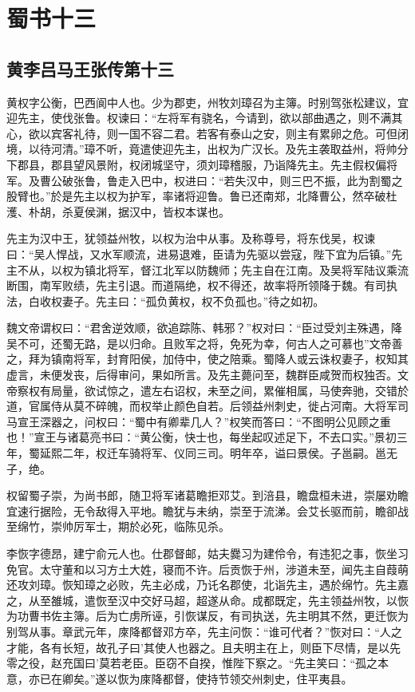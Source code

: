 \documentclass[12pt,UTF8]{ctexbook}
\begin{document}
\part{蜀书十三}
\chapter{黄李吕马王张传第十三}

黄权字公衡，巴西阆中人也。少为郡吏，州牧刘璋召为主簿。时别驾张松建议，宜迎先主，使伐张鲁。权谏曰：“左将军有骁名，今请到，欲以部曲遇之，则不满其心，欲以宾客礼待，则一国不容二君。若客有泰山之安，则主有累卵之危。可但闭境，以待河清。”璋不听，竟遣使迎先主，出权为广汉长。及先主袭取益州，将帅分下郡县，郡县望风景附，权闭城坚守，须刘璋稽服，乃诣降先主。先主假权偏将军。及曹公破张鲁，鲁走入巴中，权进曰：“若失汉中，则三巴不振，此为割蜀之股臂也。”於是先主以权为护军，率诸将迎鲁。鲁已还南郑，北降曹公，然卒破杜濩、朴胡，杀夏侯渊，据汉中，皆权本谋也。

先主为汉中王，犹领益州牧，以权为治中从事。及称尊号，将东伐吴，权谏曰：“吴人悍战，又水军顺流，进易退难，臣请为先驱以尝寇，陛下宜为后镇。”先主不从，以权为镇北将军，督江北军以防魏师；先主自在江南。及吴将军陆议乘流断围，南军败绩，先主引退。而道隔绝，权不得还，故率将所领降于魏。有司执法，白收权妻子。先主曰：“孤负黄权，权不负孤也。”待之如初。

魏文帝谓权曰：“君舍逆效顺，欲追踪陈、韩邪？”权对曰：“臣过受刘主殊遇，降吴不可，还蜀无路，是以归命。且败军之将，免死为幸，何古人之可慕也”文帝善之，拜为镇南将军，封育阳侯，加侍中，使之陪乘。蜀降人或云诛权妻子，权知其虚言，未便发丧，后得审问，果如所言。及先主薨问至，魏群臣咸贺而权独否。文帝察权有局量，欲试惊之，遣左右诏权，未至之间，累催相属，马使奔驰，交错於道，官属侍从莫不碎魄，而权举止颜色自若。后领益州刺史，徙占河南。大将军司马宣王深器之，问权曰：“蜀中有卿辈几人？”权笑而答曰：“不图明公见顾之重也！”宣王与诸葛亮书曰：“黄公衡，快士也，每坐起叹述足下，不去口实。”景初三年，蜀延熙二年，权迁车骑将军、仪同三司。明年卒，谥曰景侯。子邕嗣。邕无子，绝。

权留蜀子崇，为尚书郎，随卫将军诸葛瞻拒邓艾。到涪县，瞻盘桓未进，崇屡劝瞻宜速行据险，无令敌得入平地。瞻犹与未纳，崇至于流涕。会艾长驱而前，瞻卻战至绵竹，崇帅厉军士，期於必死，临陈见杀。

李恢字德昂，建宁俞元人也。仕郡督邮，姑夫爨习为建伶令，有违犯之事，恢坐习免官。太守董和以习方土大姓，寝而不许。后贡恢于州，涉道未至，闻先主自葭萌还攻刘璋。恢知璋之必败，先主必成，乃讬名郡使，北诣先主，遇於绵竹。先主嘉之，从至雒城，遣恢至汉中交好马超，超遂从命。成都既定，先主领益州牧，以恢为功曹书佐主簿。后为亡虏所诬，引恢谋反，有司执送，先主明其不然，更迁恢为别驾从事。章武元年，庲降都督邓方卒，先主问恢：“谁可代者？”恢对曰：“人之才能，各有长短，故孔子曰'其使人也器之。且夫明主在上，则臣下尽情，是以先零之役，赵充国曰'莫若老臣。臣窃不自揆，惟陛下察之。“先主笑曰：“孤之本意，亦已在卿矣。”遂以恢为庲降都督，使持节领交州刺史，住平夷县。
\end{document}
